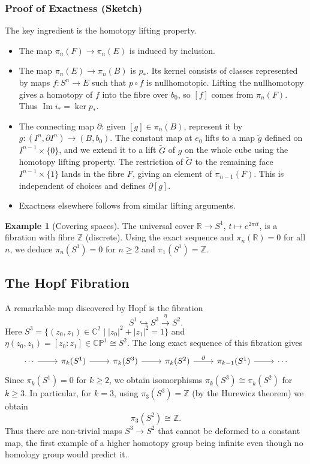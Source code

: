\documentclass{article}
\theoremstyle{definition}
\newtheorem{example}{Example}[section]
\begin{document}
\subsubsection*{Proof of Exactness (Sketch)}
The key ingredient is the homotopy lifting property. 
\begin{itemize}
    \item The map $\pi_n(F)\to \pi_n(E)$ is induced by inclusion.
    \item The map $\pi_n(E)\to \pi_n(B)$ is $p_*$. Its kernel consists of classes represented by maps $f: S^n\to E$ such that $p\circ f$ is nullhomotopic. Lifting the nullhomotopy gives a homotopy of $f$ into the fibre over $b_0$, so $[f]$ comes from $\pi_n(F)$. Thus $\operatorname{Im} i_* = \ker p_*$.
    \item The connecting map $\partial$: given $[g]\in\pi_n(B)$, represent it by $g: (I^n,\partial I^n)\to (B,b_0)$. The constant map at $e_0$ lifts to a map $\widetilde{g}$ defined on $I^{n-1}\times\{0\}$, and we extend it to a lift $\widetilde{G}$ of $g$ on the whole cube using the homotopy lifting property. The restriction of $\widetilde{G}$ to the remaining face $I^{n-1}\times\{1\}$ lands in the fibre $F$, giving an element of $\pi_{n-1}(F)$. This is independent of choices and defines $\partial[g]$.
    \item Exactness elsewhere follows from similar lifting arguments.
\end{itemize}

\begin{example}[Covering spaces]
The universal cover $\mathbb{R} \to S^1$, $t\mapsto e^{2\pi i t}$, is a fibration with fibre $\mathbb{Z}$ (discrete). Using the exact sequence and $\pi_n(\mathbb{R})=0$ for all $n$, we deduce $\pi_n(S^1)=0$ for $n\ge2$ and $\pi_1(S^1)=\mathbb{Z}$.
\end{example}

\subsection{The Hopf Fibration}
A remarkable map discovered by Hopf is the fibration
\[
S^1 \hookrightarrow S^3 \xrightarrow{\eta} S^2.
\]
Here $S^3 = \{(z_0,z_1)\in\mathbb{C}^2 \mid |z_0|^2+|z_1|^2=1\}$ and $\eta(z_0,z_1) = [z_0:z_1] \in \mathbb{CP}^1 \cong S^2$. The long exact sequence of this fibration gives
\[
\begin{tikzcd}
\cdots \arrow[r] & \pi_k(S^1) \arrow[r] & \pi_k(S^3) \arrow[r] & \pi_k(S^2) \arrow[r, "\partial"] & \pi_{k-1}(S^1) \arrow[r] & \cdots
\end{tikzcd}
\]
Since $\pi_k(S^1)=0$ for $k\ge2$, we obtain isomorphisms $\pi_k(S^3)\cong \pi_k(S^2)$ for $k\ge3$. In particular, for $k=3$, using $\pi_3(S^3)=\mathbb{Z}$ (by the Hurewicz theorem) we obtain
\[
\pi_3(S^2) \cong \mathbb{Z}.
\]
Thus there are non‑trivial maps $S^3 \to S^2$ that cannot be deformed to a constant map, the first example of a higher homotopy group being infinite even though no homology group would predict it.
\end{document}
